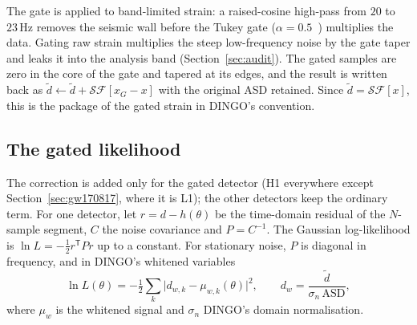 \documentclass{openjournal}
\newcommand{\tp}{^{\mathsf{T}}}
\begin{document}
The gate is applied to band-limited strain: a raised-cosine high-pass from $20$ to $23\,\mathrm{Hz}$ removes the seismic wall before the Tukey gate ($\alpha=0.5$~\cite{Harris1978windows}) multiplies the data.
Gating raw strain multiplies the steep low-frequency noise by the gate taper and leaks it into the analysis band (Section~\ref{sec:audit}).
The gated samples are zero in the core of the gate and tapered at its edges, and the result is written back as $\tilde d \leftarrow \tilde d + \mathcal{S}\mathcal{F}[x_G - x]$ with the original ASD retained.
Since $\tilde d=\mathcal{S}\mathcal{F}[x]$, this is the package of the gated strain in DINGO's convention.

\subsection{The gated likelihood}
\label{sec:gatedlik}

The correction is added only for the gated detector (H1 everywhere except Section~\ref{sec:gw170817}, where it is L1); the other detectors keep the ordinary term. For one detector, let $r = d - h(\theta)$ be the time-domain residual of the $N$-sample segment, $C$ the noise covariance and $P=C^{-1}$.
The Gaussian log-likelihood is $\ln L = -\tfrac12 r\tp P r$ up to a constant.
For stationary noise, $P$ is diagonal in frequency, and in DINGO's whitened variables
\begin{equation}
\ln L(\theta) = -\tfrac12 \sum_k \bigl|d_{w,k} - \mu_{w,k}(\theta)\bigr|^2,
\qquad d_w = \frac{\tilde d}{\sigma_n\, \mathrm{ASD}},
\label{eq:whittle}
\end{equation}
where $\mu_w$ is the whitened signal and $\sigma_n$ DINGO's domain normalisation.
\end{document}
